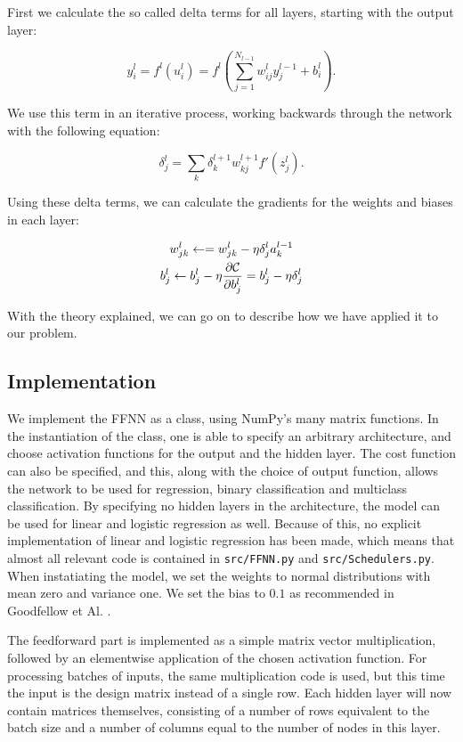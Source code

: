 \documentclass[onecolumn,10pt,cleanfoot]{asme2ej}
\begin{document}
First we calculate the so called delta terms for all layers, starting with the output layer:

\begin{equation}
y_i^l = f^l(u_i^l) = f^l\left(\sum_{j=1}^{N_{l-1}} w_{ij}^l y_j^{l-1} + b_i^l\right).
\end{equation}

We use this term in an iterative process, working backwards through the network with the following equation:

\begin{equation}
\delta_j^l = \sum_k \delta_k^{l+1}w_{kj}^{l+1}f'(z_j^l).
\end{equation}

Using these delta terms, we can calculate the gradients for the weights and biases in each layer:

\begin{gather}
w_{jk}^l\leftarrow  = w_{jk}^l- \eta \delta_j^la_k^{l-1} \\
b_j^l \leftarrow b_j^l-\eta \frac{\partial {\cal C}}{\partial b_j^l}=b_j^l-\eta \delta_j^l
\end{gather}

With the theory explained, we can go on to describe how we have applied it to our problem.

\subsection{Implementation}

We implement the FFNN as a class, using NumPy's many matrix functions. In the instantiation of the class, one is able to specify an arbitrary architecture, and choose activation functions for the output and the hidden layer. The cost function can also be specified, and this, along with the choice of output function, allows the network to be used for regression, binary classification and multiclass classification. By specifying no hidden layers in the architecture, the model can be used for linear and logistic regression as well. Because of this, no explicit implementation of linear and logistic regression has been made, which means that almost all relevant code is contained in \texttt{src/FFNN.py} and \texttt{src/Schedulers.py}. When instatiating the model, we set the weights to normal distributions with mean zero and variance one. We set the bias to $0.1$ as recommended in Goodfellow et Al. \cite[189]{gbc}.

The feedforward part is implemented as a simple matrix vector multiplication, followed by an elementwise application of the chosen activation function. For processing batches of inputs, the same multiplication code is used, but this time the input is the design matrix instead of a single row. Each hidden layer will now contain matrices themselves, consisting of a number of rows equivalent to the batch size and a number of columns equal to the number of nodes in this layer.
\end{document}
